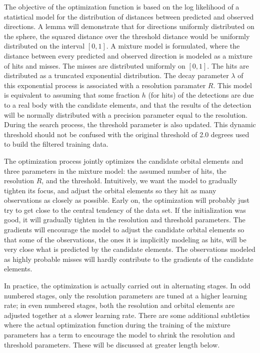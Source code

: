 The objective of the optimization function is based on the log likelihood of a statistical model for the 
distribution of distances between predicted and observed directions.
A lemma will demonstrate that for directions uniformly distributed on the sphere, the squared distance over the 
threshold distance would be uniformly distributed on the interval $[0, 1]$.
A mixture model is formulated, where the distance between every predicted and observed direction is modeled as a mixture of hits and misses.
The misses are distributed uniformly on $[0, 1]$.
The hits are distributed as a truncated exponential distribution.
The decay parameter $\lambda$ of this exponential process is associated with a resolution paramater $R$.
This model is equivalent to assuming that some fraction $h$ (for hits) of the detections are due to 
a real body with the candidate elements, and that the results of the detection will be normally distributed 
with a precision parameter equal to the resolution.
During the search process, the threshold parameter is also updated.
This dynamic threshold should not be confused with the original threshold of 2.0 degrees used to build the filtered training data.

The optimization process jointly optimizes the candidate orbital elements and three parameters in the mixture model:
the assumed number of hits, the resolution $R$, and the threshold.
Intuitively, we want the model to gradually tighten its focus, and adjust the orbital elements so they hit as many observations
as closely as possible.
Early on, the optimization will probably just try to get close to the central tendency of the data set.
If the initialization was good, it will gradually tighten in the resolution and threshold parameters.
The gradients will encourage the model to adjust the candidate orbital elements so that some of the observations,
the ones it is implicitly modeling as hits, will be very close what is predicted by the candidate elements.
The observations modeled as highly probable misses will hardly contribute to the gradients of the candidate elements.

In practice, the optimization is actually carried out in alternating stages.
In odd numbered stages, only the resolution parameters are tuned at a higher learning rate;
in even numbered stages, both the resolution and orbital elements are adjusted together at a slower learning rate.
There are some additional subtleties where the actual optimization function during the training of the mixture
parameters has a term to encourage the model to shrink the resolution and threshold parameters.
These will be discussed at greater length below.

